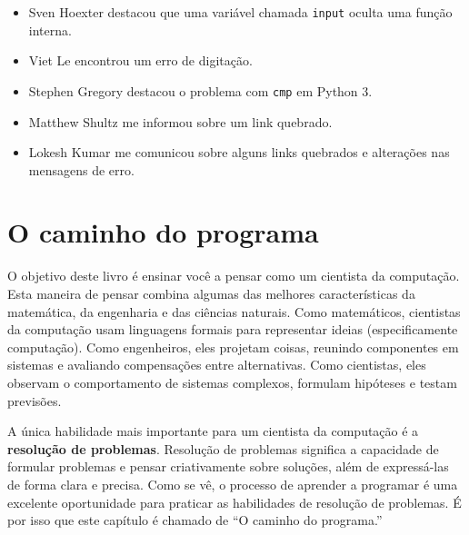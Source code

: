 \documentclass[10pt]{book}
\begin{document}
\begin {itemize}
\item Sven Hoexter destacou que uma variável chamada {\tt input}
oculta uma função interna.

\item Viet Le encontrou um erro de digitação.

\item Stephen Gregory destacou o problema com {\tt cmp}
em Python 3.

\item Matthew Shultz me informou sobre um link quebrado.

\item Lokesh Kumar me comunicou sobre alguns links quebrados e
alterações nas mensagens de erro.


\end{itemize}

\normalsize
\clearemptydoublepage

\begin{latexonly}

\tableofcontents

\clearemptydoublepage

\end{latexonly}

\mainmatter

\chapter{O caminho do programa}

O objetivo deste livro é ensinar você a pensar como um
cientista da computação. Esta maneira de pensar combina algumas das melhores características
da matemática, da engenharia e das ciências naturais. Como matemáticos,
cientistas da computação usam linguagens formais para representar ideias (especificamente
computação). Como engenheiros, eles projetam coisas, reunindo componentes
em sistemas e avaliando compensações entre alternativas. Como cientistas,
eles observam o comportamento de sistemas complexos, formulam hipóteses e testam
previsões.

A única habilidade mais importante para um cientista da computação é a {\bf
resolução de problemas}. Resolução de problemas significa a capacidade de formular
problemas e pensar criativamente sobre soluções, além de expressá-las de forma clara
e precisa. Como se vê, o processo de aprender a programar é uma
excelente oportunidade para praticar as habilidades de resolução de problemas. É por isso que
este capítulo é chamado de ``O caminho do programa.''
\end{document}
